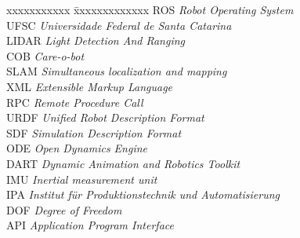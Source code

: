 \ifx\isenglish\undefined
{}
\else
{}
\fi


\begin{tabbing}
xxxxxxxxxxx \= xxxxxxxxxxxxx \kill
\textsc{ROS}            \> \textit{Robot Operating System}\\
\textsc{UFSC} \> \textit{Universidade Federal de Santa Catarina}\\
\textsc{LIDAR}            \> \textit{Light Detection And Ranging}\\
\textsc{COB}            \> \textit{Care-o-bot}\\
\textsc{SLAM}            \> \textit{Simultaneous localization and mapping}\\
\textsc{XML}            \> \textit{Extensible Markup Language}\\
\textsc{RPC}            \> \textit{Remote Procedure Call}\\
\textsc{URDF}            \> \textit{Unified Robot Description Format}\\
\textsc{SDF}            \> \textit{Simulation Description Format}\\
\textsc{ODE} \> \textit{Open Dynamics Engine} \\
\textsc{DART} \> \textit{Dynamic Animation and Robotics Toolkit} \\
\textsc{IMU} \> \textit{Inertial measurement unit} \\
\textsc{IPA} \> \textit{Institut f{\"u}r Produktionstechnik und Automatisierung} \\
\textsc{DOF} \> \textit{Degree of Freedom} \\
\textsc{API} \> \textit{Application Program Interface} \\


\end{tabbing}

